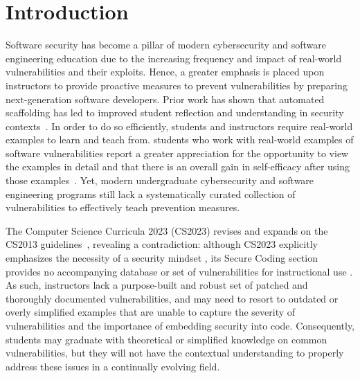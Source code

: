 \section{Introduction}
\done{}
\done{}
\done{}
Software security has become a pillar of modern cybersecurity and software engineering education due to the increasing frequency and impact of real-world vulnerabilities and their exploits. Hence, a greater emphasis is placed upon instructors to provide proactive measures to prevent vulnerabilities by preparing next-generation software developers. Prior work has shown that automated scaffolding has led to improved student reflection and understanding in security contexts~\cite{chen2019using}. In order to do so efficiently,  students and instructors require real-world examples to learn and teach from.   students who work with real-world examples of software vulnerabilities report a greater appreciation for the opportunity to view the examples in detail and that there is an overall gain in self-efficacy after using those examples~\cite{fie2024dlcd}. Yet, modern undergraduate cybersecurity and software engineering programs still lack a systematically curated collection of vulnerabilities to effectively teach prevention measures.

The  Computer Science Curricula 2023 (CS2023) revises and expands on the  CS2013 guidelines~\cite{cscurriculum2023}, revealing a contradiction: although CS2023 explicitly emphasizes the necessity of a security mindset \cite[page 256]{cscurriculum2023}, its Secure Coding section provides no accompanying database or set of vulnerabilities for instructional use \cite[page 259]{cscurriculum2023}. As such, instructors lack a purpose-built and robust set of patched and thoroughly documented vulnerabilities, and may need to resort to outdated or overly simplified examples that are unable to capture the severity of vulnerabilities and the importance of embedding security into code. Consequently, students may graduate with theoretical or simplified knowledge on common vulnerabilities, but they will not have the contextual understanding to properly address these issues in a continually evolving field.

